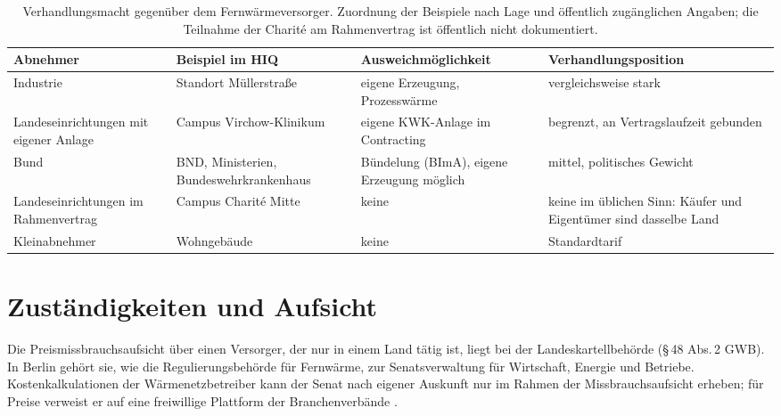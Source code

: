 \documentclass[11pt,DIV=13,a4paper,parskip=half,abstract=true,ngerman]{scrartcl}
\begin{document}
\begin{table}[ht]
    \small\centering
    \begin{tabularx}{\linewidth}{@{}>{\raggedright}p{2.8cm}>{\raggedright}p{3.4cm}>{\raggedright\arraybackslash}X>{\raggedright\arraybackslash}p{3.0cm}@{}}
        \toprule
        Abnehmer & Beispiel im HIQ & Ausweichmöglichkeit & Verhandlungsposition \\
        \midrule
        Industrie & Standort Müllerstraße & eigene Erzeugung, Prozesswärme & vergleichsweise stark \\
        Landeseinrichtungen mit eigener Anlage & Campus Virchow-Klinikum & eigene KWK-Anlage im Contracting & begrenzt, an Vertragslaufzeit gebunden \\
        Bund & BND, Ministerien, Bundeswehrkrankenhaus & Bündelung (BImA), eigene Erzeugung möglich & mittel, politisches Gewicht \\
        Landeseinrichtungen im Rahmenvertrag & Campus Charité Mitte & keine & keine im üblichen Sinn: Käufer und Eigentümer sind dasselbe Land \\
        Kleinabnehmer & Wohngebäude & keine & Standardtarif \\
        \bottomrule
    \end{tabularx}
    
    \caption{Verhandlungsmacht gegenüber dem Fernwärmeversorger. Zuordnung der
    Beispiele nach Lage und öffentlich zugänglichen Angaben; die Teilnahme der Charité am Rahmenvertrag ist öffentlich nicht dokumentiert.}\label{tab:typen}
\end{table}

\section{Zuständigkeiten und Aufsicht}\label{sec:aufsicht}

Die Preismissbrauchsaufsicht über einen Versorger, der nur in einem Land tätig ist, liegt bei der Landeskartellbehörde (§\,48 Abs.\,2 GWB).
In Berlin gehört sie, wie die Regulierungsbehörde für Fernwärme, zur Senatsverwaltung für Wirtschaft, Energie und Betriebe.
Kostenkalkulationen der Wärmenetzbetreiber kann der Senat nach eigener Auskunft nur im Rahmen der Missbrauchsaufsicht erheben; für Preise verweist er auf eine freiwillige Plattform der Branchenverbände \parencite{agh2026s1926754}.
\end{document}
